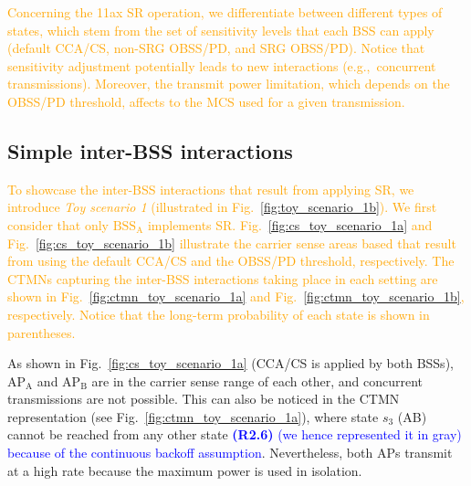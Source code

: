 \documentclass{ieeeaccess}
\begin{document}
\textcolor{orange}{Concerning the 11ax SR operation, we differentiate between different types of states, which stem from the set of sensitivity levels that each BSS can apply (default CCA/CS, non-SRG OBSS/PD, and SRG OBSS/PD). Notice that sensitivity adjustment potentially leads to new interactions (e.g.,~concurrent transmissions). Moreover, the transmit power limitation, which depends on the OBSS/PD threshold, affects to the MCS used for a given transmission.}

\subsection{Simple inter-BSS interactions}
\label{section:simple_interactions}
\textcolor{orange}{To showcase the inter-BSS interactions that result from applying SR, we introduce \emph{Toy scenario 1} (illustrated in Fig.~\ref{fig:toy_scenario_1b}). We first consider that only $\text{BSS}_\text{A}$ implements SR. Fig.~\ref{fig:cs_toy_scenario_1a} and Fig.~\ref{fig:cs_toy_scenario_1b} illustrate the carrier sense areas based that result from using the default CCA/CS and the OBSS/PD threshold, respectively. The CTMNs capturing the inter-BSS interactions taking place in each setting are shown in Fig.~\ref{fig:ctmn_toy_scenario_1a} and Fig.~\ref{fig:ctmn_toy_scenario_1b}, respectively. Notice that the long-term probability of each state is shown in parentheses.}

As shown in Fig.~\ref{fig:cs_toy_scenario_1a} (CCA/CS is applied by both BSSs), $\text{AP}_\text{A}$ and $\text{AP}_\text{B}$ are in the carrier sense range of each other, and concurrent transmissions are not possible. This can also be noticed in the CTMN representation (see Fig.~\ref{fig:ctmn_toy_scenario_1a}), where state $s_3$ (AB) cannot be reached from any other state \textcolor{blue}{\textbf{(R2.6)} (we hence represented it in gray) because of the continuous backoff assumption}. Nevertheless, both APs transmit at a high rate because the maximum power is used in isolation. %
\end{document}
